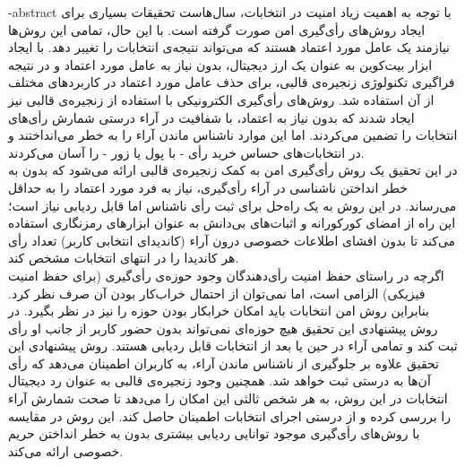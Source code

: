 \documentclass[oneside,openany,msc]{SBU-Thesis}
\begin{document}
	\fa-abstract{	
با توجه به اهمیت زیاد امنیت در انتخابات، سال‌هاست تحقیقات بسیاری برای ایجاد روش‌های رأی‌گیری امن صورت گرفته است. با این حال، تمامی این روش‌ها نیازمند یک عامل مورد اعتماد هستند که می‌تواند نتیجه‌ی انتخابات را تغییر دهد. با ایجاد ابزار بیت‌کوین به عنوان یک ارز دیجیتال، بدون نیاز به عامل مورد اعتماد و در نتیجه فراگیری تکنولوژی زنجیره‌ی‌ قالبی، برای حذف عامل مورد اعتماد در کاربردهای مختلف از آن استفاده شد. روش‌های رأی‌گیری الکترونیکی با استفاده از زنجیره‌ی قالبی نیز ایجاد شدند که بدون نیاز به اعتماد، با شفافیت در آراء درستی شمارش رأی‌های انتخابات را تضمین می‌کردند. اما این موارد ناشناس ماندن آراء را به خطر می‌انداختند و در انتخابات‌های حساس خرید رأی - با پول یا زور - را آسان می‌کردند.
\\
در این تحقیق یک روش رأی‌گیری امن به کمک زنجیره‌ی قالبی ارائه می‌شود که بدون به خطر انداختن ناشناسی در آراء رأی‌گیری، نیاز به فرد مورد اعتماد را به حداقل می‌رساند. در این روش به یک راه‌حل برای ثبت رأی ناشناس اما قابل ردیابی نیاز است؛ این راه از امضای کورکورانه و اثبات‌های بی‌دانش به عنوان ابزارهای رمزنگاری استفاده می‌کند تا بدون افشای اطلاعات خصوصی درون آراء (کاندیدای انتخابی کاربر) تعداد رأی هر کاندیدا را در انتهای انتخابات مشخص کند.
\\
اگرچه در راستای حفظ امنیت رأی‌دهندگان وجود حوزه‌ی رأی‌گیری (برای حفظ امنیت فیزیکی) الزامی است، اما نمی‌توان از احتمال خراب‌کار بودن آن صرف نظر کرد. بنابراین روش امن انتخابات باید امکان خرابکار بودن حوزه را نیز در نظر بگیرد. در روش پیشنهادی این تحقیق هیچ حوزه‌ای نمی‌تواند بدون حضور کاربر از جانب او رأی ثبت کند و تمامی آراء در حین یا بعد از انتخابات قابل ردیابی هستند.
روش پیشنهادی این تحقیق علاوه بر جلوگیری از ناشناس ماندن آراء، به کاربران اطمینان می‌دهد که رأی آن‌ها به درستی ثبت خواهد شد. همچنین وجود زنجیره‌ی قالبی به عنوان رد دیجیتال انتخابات در این روش، به هر شخص ثالثی این امکان را می‌دهد تا صحت شمارش آراء را بررسی کرده و از درستی اجرای انتخابات اطمینان حاصل کند. این روش در مقایسه‌ با روش‌های رأی‌گیری موجود توانایی ردیابی بیشتری بدون به خطر انداختن حریم خصوصی ارائه می‌کند.
	}
	
\firstPage %
\davaranPage %
\end{document}
